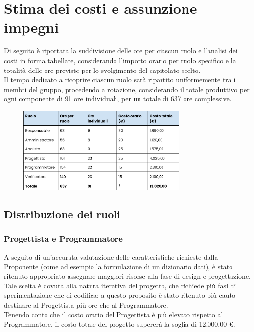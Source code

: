 





\makeFrontPage


\clearpage

\tableofcontents
\clearpage

\section{Stima dei costi e assunzione impegni}
Di seguito è riportata la suddivisione delle ore per ciascun ruolo e l'analisi dei costi in forma tabellare, considerando l'importo orario per ruolo specifico e la totalità delle ore previste per lo svolgimento del capitolato scelto.\\
Il tempo dedicato a ricoprire ciascun ruolo sarà ripartito uniformemente tra i membri del gruppo, procedendo a rotazione, considerando il totale produttivo per ogni componente di 91 ore individuali, per un totale di 637 ore complessive.

\begin{figure}[H]
  \centering
  \includegraphics[width=0.75\textwidth]{assets/tabellacosti.png}
\end{figure}

\subsection{Distribuzione dei ruoli}

\subsubsection{Progettista e Programmatore}
A seguito di un'accurata valutazione delle caratteristiche richieste dalla Proponente (come ad esempio la formulazione di un dizionario dati), è stato ritenuto appropriato assegnare maggiori risorse alla fase di design e progettazione. Tale scelta è dovuta alla natura iterativa del progetto, che richiede più fasi di sperimentazione che di codifica: a questo proposito è stato ritenuto più cauto destinare al Progettista più ore che al Programmatore.\\
Tenendo conto che il costo orario del Progettista è più elevato rispetto al Programmatore, il costo totale del progetto supererà la soglia di 12.000,00 €.

